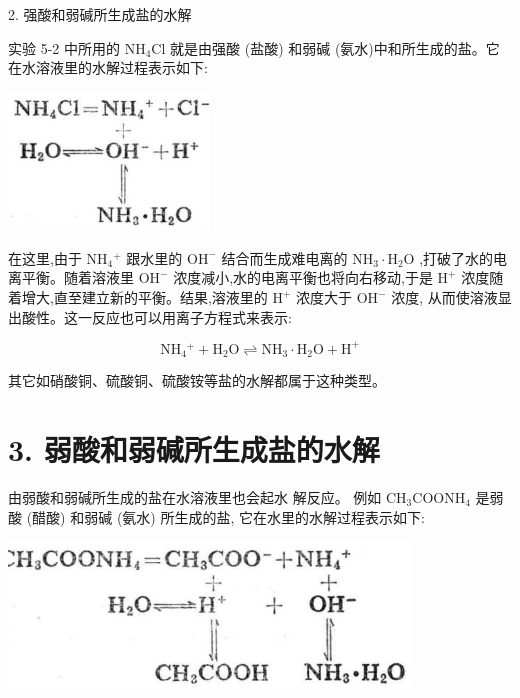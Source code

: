 \documentclass[10pt]{article}
\begin{document}
2. 强酸和弱碱所生成盐的水解

实验 5-2 中所用的 \({\mathrm{{NH}}}_{4}\mathrm{{Cl}}\) 就是由强酸 (盐酸) 和弱碱 (氨水)中和所生成的盐。它在水溶液里的水解过程表示如下:

\begin{center}
\includegraphics[max width=0.4\textwidth]{images/01912d13-9986-7822-a012-3f3f7be99dcb_145_660897.jpg}
\end{center}

在这里,由于 \({\mathrm{{NH}}}_{4}{}^{ + }\) 跟水里的 \({\mathrm{{OH}}}^{ - }\) 结合而生成难电离的 \({\mathrm{{NH}}}_{3} \cdot {\mathrm{H}}_{2}\mathrm{O}\) ,打破了水的电离平衡。随着溶液里 \({\mathrm{{OH}}}^{ - }\) 浓度减小,水的电离平衡也将向右移动,于是 \({\mathrm{H}}^{ + }\) 浓度随着增大,直至建立新的平衡。结果,溶液里的 \({\mathrm{H}}^{ + }\) 浓度大于 \({\mathrm{{OH}}}^{ - }\) 浓度, 从而使溶液显出酸性。这一反应也可以用离子方程式来表示:

\[
{\mathrm{{NH}}}_{4}{}^{ + } + {\mathrm{H}}_{2}\mathrm{O} \rightleftharpoons {\mathrm{{NH}}}_{3} \cdot {\mathrm{H}}_{2}\mathrm{O} + {\mathrm{H}}^{ + }
\]

其它如硝酸铜、硫酸铜、硫酸铵等盐的水解都属于这种类型。

\section*{3. 弱酸和弱碱所生成盐的水解}

由弱酸和弱碱所生成的盐在水溶液里也会起水 解反应。 例如 \({\mathrm{{CH}}}_{3}{\mathrm{{COONH}}}_{4}\) 是弱酸 (醋酸) 和弱碱 (氨水) 所生成的盐, 它在水里的水解过程表示如下:

\begin{center}
\includegraphics[max width=0.8\textwidth]{images/01912d13-9986-7822-a012-3f3f7be99dcb_145_844656.jpg}
\end{center}
\end{document}
